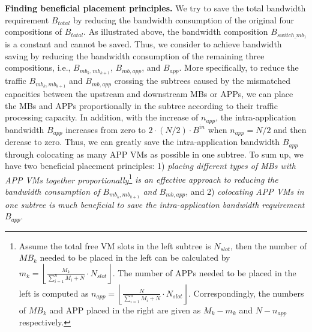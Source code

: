 \documentclass[review]{elsarticle}
\begin{document}
\textbf{Finding beneficial placement principles.} We try to save the total bandwidth requirement $B_{total}$ by reducing the bandwidth consumption of the original four compositions of $B_{total}$. As illustrated above, the bandwidth composition $B_{switch\_mb_1}$ is a constant and cannot be saved.
Thus, we consider to achieve bandwidth saving by reducing the bandwidth consumption of the remaining three compositions, i.e., $B_{mb_k,mb_{k+1}}$, $B_{mb,app}$, and $B_{app}$. %
More specifically, to reduce the traffic $B_{mb_k,mb_{k+1}}$ and $B_{mb,app}$ crossing the subtrees caused by the mismatched capacities between the upstream and downstream MBs or APPs, we can place the MBs and APPs proportionally in the subtree according to their traffic processing capacity. In addition, %
with the increase of $n_{app}$, the intra-application bandwidth $B_{app}$ increases from zero to $2\cdot (N/2)\cdot B^{in}$ when $n_{app} = N/2$ and then derease to zero. Thus, we can greatly save the intra-application bandwidth $B_{app}$ through colocating as many APP VMs as possible in one subtree. To sum up, we have two beneficial placement principles: 1) \emph{placing different types of MBs with APP VMs together proportionally}\footnote{Assume the total free VM slots in the left subtree is $N_{slot}$, then the number of $MB_k$ needed to be 
	placed in the left can be calculated by $m_k=\left\lfloor\frac{M_k}{\sum\nolimits_{i=1}^{n}M_i+N}\cdot N_{slot}\right\rfloor$. The number of APPs needed to be placed in the left is computed as $n_{app}=\left\lfloor\frac{N}{\sum\nolimits_{i=1}^{n}M_i+N}\cdot N_{slot}\right\rfloor$. Correspondingly, the numbers of $MB_k$ and APP placed in the right are given as $M_k-m_k$ and $N-n_{app}$ respectively.} \emph{is an effective approach to reducing the bandwidth consumption of $B_{mb_k,mb_{k+1}}$ and $B_{mb,app}$}, and 2) \emph{colocating APP VMs in one subtree is much beneficial to save the intra-application bandwidth requirement $B_{app}$}. 
\end{document}
